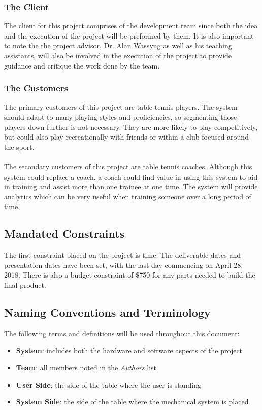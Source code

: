 \documentclass[11pt]{article}
\begin{document}
\subsubsection{The Client}
The client for this project comprises of the development team since both the idea and the execution of the project will be preformed by them. It is also important to note the the project advisor, Dr. Alan Wassyng as well as his teaching assistants, will also be involved in the execution of the project to provide guidance and critique the work done by the team.
\subsubsection{The Customers}
The primary customers of this project are table tennis players. The system should adapt to many playing styles and proficiencies, so segmenting those players down further is not necessary. They are more likely to play competitively, but could also play recreationally with friends or within a club focused around the sport. \\\\
The secondary customers of this project are table tennis coaches. Although this system could replace a coach, a coach could find value in using this system to aid in training and assist more than one trainee at one time. The system will provide analytics which can be very useful when training someone over a long period of time.
\subsection{Mandated Constraints}
The first constraint placed on the project is time. The deliverable dates and presentation dates have been set, with the last day commencing on April 28, 2018. There is also a budget constraint of \$750 for any parts needed to build the final product.
\subsection{Naming Conventions and Terminology}
The following terms and definitions will be used throughout this document:
\begin{itemize}
\item \textbf{System}: includes both the hardware and software aspects of the project
\item \textbf{Team}: all members noted in the \textit{Authors} list
\item \textbf{User Side}: the side of the table where the user is standing
\item \textbf{System Side}: the side of the table where the mechanical system is placed
\end{itemize}
\end{document}
